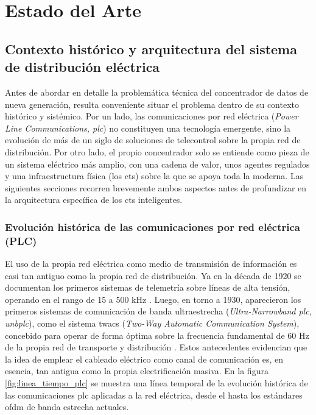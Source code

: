 \chapter{Estado del Arte}
\label{ch:state_of_the_art}

\section{Contexto histórico y arquitectura del sistema de distribución eléctrica}
\label{sec:contexto_historico_arquitectura}

Antes de abordar en detalle la problemática técnica del concentrador de datos de nueva generación, resulta conveniente situar el problema dentro de su contexto histórico y sistémico. Por un lado, las comunicaciones por red eléctrica (\textit{Power Line Communications, \gls{plc}}) no constituyen una tecnología emergente, sino la evolución de más de un siglo de soluciones de telecontrol sobre la propia red de distribución. Por otro lado, el propio concentrador solo se entiende como pieza de un sistema eléctrico más amplio, con una cadena de valor, unos agentes regulados y una infraestructura física (los \glspl{ct}) sobre la que se apoya toda la  moderna. Las siguientes secciones recorren brevemente ambos aspectos antes de profundizar en la arquitectura específica de los \glspl{ct} inteligentes.

\subsection{Evolución histórica de las comunicaciones por red eléctrica (PLC)}
\label{subsec:evolucion_plc}

El uso de la propia red eléctrica como medio de transmisión de información es casi tan antiguo como la propia red de distribución. Ya en la década de 1920 se documentan los primeros sistemas de telemetría sobre líneas de alta tensión, operando en el rango de 15 a 500 kHz \cite{SHARMA2017704}. Luego, en torno a 1930, aparecieron los primeros sistemas de comunicación de banda ultraestrecha (\textit{Ultra-Narrowband \gls{plc}, \gls{unbplc}}), como el sistema \gls{twacs} (\textit{Two-Way Automatic Communication System}), concebido para operar de forma óptima sobre la frecuencia fundamental de 60 Hz de la propia red de transporte y distribución \cite{SHARMA2017704}. Estos antecedentes evidencian que la idea de emplear el cableado eléctrico como canal de comunicación es, en esencia, tan antigua como la propia electrificación masiva. En la figura \ref{fig:linea_tiempo_plc} se muestra una línea temporal de la evolución histórica de las comunicaciones \gls{plc} aplicadas a la red eléctrica, desde el  hasta los estándares \gls{ofdm} de banda estrecha actuales.

